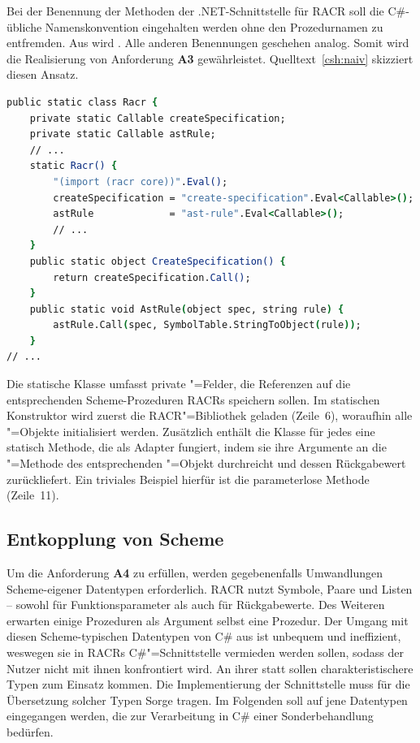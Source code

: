 Bei der Benennung der Methoden der .NET-Schnittstelle für RACR soll die C\#-übliche Namenskonvention eingehalten werden ohne den Prozedurnamen zu entfremden. Aus  wird . Alle anderen Benennungen geschehen analog. Somit wird die Realisierung von Anforderung \textbf{A3} gewährleistet. Quelltext~\ref{csh:naiv} skizziert diesen Ansatz.

\begin{lstlisting}[language=csh, caption={Prozedurale C\#"=Schnittstelle für RACR}, label=csh:naiv]
public static class Racr {
	private static Callable createSpecification;
	private static Callable astRule;
	// ...
	static Racr() {
		"(import (racr core))".Eval();
		createSpecification	= "create-specification".Eval<Callable>();
		astRule				= "ast-rule".Eval<Callable>();
		// ...
	}
	public static object CreateSpecification() {
		return createSpecification.Call();
	}
	public static void AstRule(object spec, string rule) {
		astRule.Call(spec, SymbolTable.StringToObject(rule));
	}
// ...
\end{lstlisting}

Die statische Klasse  umfasst private "=Felder, die Referenzen auf die entsprechenden Scheme-Prozeduren RACRs speichern sollen. Im statischen Konstruktor wird zuerst die RACR"=Bibliothek geladen (Zeile~6), woraufhin alle "=Objekte initialisiert werden. Zusätzlich enthält die Klasse für jedes  eine statisch Methode, die als Adapter fungiert, indem sie ihre Argumente an die "=Methode des entsprechenden "=Objekt durchreicht und dessen Rückgabewert zurückliefert. Ein triviales Beispiel hierfür ist die parameterlose Methode  (Zeile~11).

\subsection{Entkopplung von Scheme}

Um die Anforderung \textbf{A4} zu erfüllen, werden gegebenenfalls Umwandlungen Scheme-eigener Datentypen erforderlich. RACR nutzt Symbole, Paare und Listen – sowohl für Funktionsparameter als auch für Rückgabewerte. Des Weiteren erwarten einige Prozeduren als Argument selbst eine Prozedur. Der Umgang mit diesen Scheme-typischen Datentypen von C\# aus ist unbequem und ineffizient, weswegen sie in RACRs C\#"=Schnittstelle vermieden werden sollen, sodass der Nutzer nicht mit ihnen konfrontiert wird. An ihrer statt sollen charakteristischere Typen zum Einsatz kommen. Die Implementierung der Schnittstelle muss für die Übersetzung solcher Typen Sorge tragen. Im Folgenden soll auf jene Datentypen eingegangen werden, die zur Verarbeitung in C\# einer Sonderbehandlung bedürfen.

